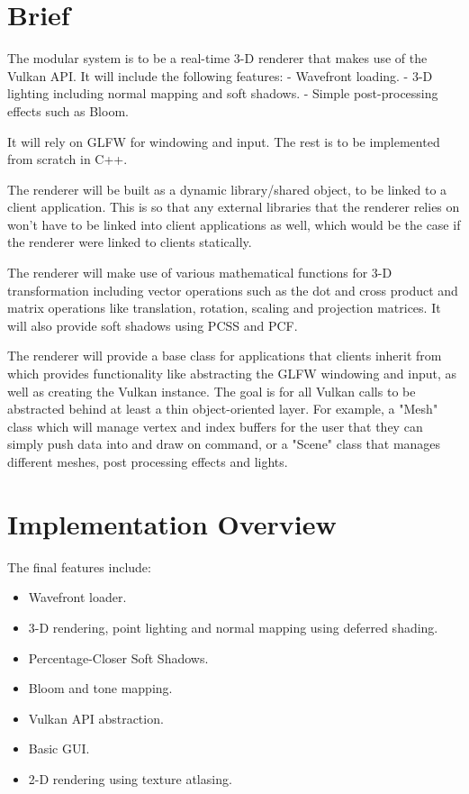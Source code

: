 \documentclass[8pt]{article}
\begin{document}
		\begin{multicols}{2}
			\section{Brief}
			The modular system is to be a real-time 3-D renderer that makes
			use of the Vulkan API. It will include the following features:
			 - Wavefront loading.
			 - 3-D lighting including normal mapping and soft shadows.
			 - Simple post-processing effects such as Bloom.

			It will rely on GLFW for windowing and input. The rest is to be
			implemented from scratch in C++.

			The renderer will be built as a dynamic library/shared object, to
			be linked to a client application. This is so that any external
			libraries that the renderer relies on won't have to be linked into
			client applications as well, which would be the case if the renderer
			were linked to clients statically.

			The renderer will make use of various mathematical functions for
			3-D transformation including vector operations such as the dot
			and cross product and matrix operations like translation, rotation,
			scaling and projection matrices. It will also provide soft shadows
			using PCSS and PCF.

			The renderer will provide a base class for applications that clients
			inherit from which provides functionality like abstracting the GLFW
			windowing and input, as well as creating the Vulkan instance. The
			goal is for all Vulkan calls to be abstracted behind at least a thin
			object-oriented layer. For example, a "Mesh" class which will manage
			vertex and index buffers for the user that they can simply push data
			into and draw on command, or a "Scene" class that manages different
			meshes, post processing effects and lights.

			\section{Implementation Overview}
			The final features include:
			\begin{itemize}
				\item Wavefront loader.
				\item 3-D rendering, point lighting and normal mapping using deferred shading.
				\item Percentage-Closer Soft Shadows.
				\item Bloom and tone mapping.
				\item Vulkan API abstraction.
				\item Basic GUI.
				\item 2-D rendering using texture atlasing.
			\end{itemize}


\end{multicols}
\end{document}

